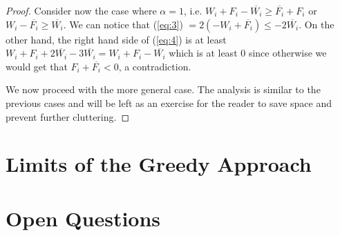 \documentclass[11pt,letter]{article}
\begin{document}
\begin{proof}
Consider now the case where $\alpha = 1$, i.e. $W_i + F_i -\overline{W_i} \geq \overline{F_i} + F_i$ or $W_i - \overline{F_i} \geq \overline{W_i}$.
We can notice that (\ref{eq:3}) $= 2(-W_i + \overline{F_i}) \leq -2\overline{W_i}$. On the other hand, the right hand side of  (\ref{eq:4})
is at least $W_i + F_i + 2\overline{W_i} -3\overline{W_i} = W_i + F_i - \overline{W_i}$ which is at least $0$ since otherwise we would get
that $F_i + \overline{F_i} < 0$, a contradiction.

We now proceed with the more general case. The analysis is similar to the previous cases and will be left as an exercise
for the reader to save space and prevent further cluttering.

\end{proof}

\section{Limits of the Greedy Approach}\label{S:limits}
\section{Open Questions}\label{S:open}



\end{document}
